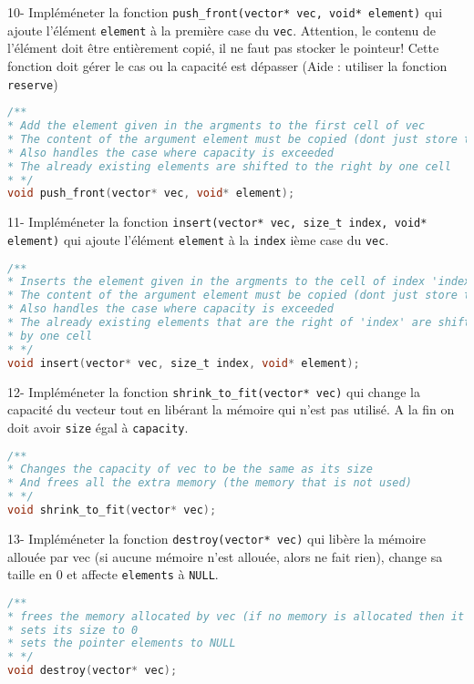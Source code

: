 \documentclass[a4paper]{article}
\begin{document}
	10- Impléméneter la fonction \texttt{push\_front(vector* vec, void* element)} qui ajoute l'élément \texttt{element} à la première case du \texttt{vec}. Attention, le contenu de l'élément doit être entièrement copié, il ne faut pas stocker le pointeur! Cette fonction doit gérer le cas ou la capacité est dépasser (Aide : utiliser la fonction \texttt{reserve})
\begin{lstlisting}[language=C]
/**
* Add the element given in the argments to the first cell of vec
* The content of the argument element must be copied (dont just store the pointer)
* Also handles the case where capacity is exceeded
* The already existing elements are shifted to the right by one cell
* */
void push_front(vector* vec, void* element);
\end{lstlisting}

	11- Impléméneter la fonction \texttt{insert(vector* vec, size\_t index, void* element)} qui ajoute l'élément \texttt{element} à la \texttt{index} ième case du \texttt{vec}.
	\begin{lstlisting}[language=C]
/**
* Inserts the element given in the argments to the cell of index 'index'
* The content of the argument element must be copied (dont just store the pointer)
* Also handles the case where capacity is exceeded
* The already existing elements that are the right of 'index' are shifted to the right 
* by one cell
* */
void insert(vector* vec, size_t index, void* element);
	\end{lstlisting}

	12- Impléméneter la fonction \texttt{shrink\_to\_fit(vector* vec)} qui change la capacité du vecteur tout en libérant la mémoire qui n'est pas utilisé. A la fin on doit avoir \texttt{size} égal à \texttt{capacity}.
\begin{lstlisting}[language=C]
/**
* Changes the capacity of vec to be the same as its size
* And frees all the extra memory (the memory that is not used)
* */
void shrink_to_fit(vector* vec);
\end{lstlisting}

	13- Impléméneter la fonction \texttt{destroy(vector* vec)} qui libère la mémoire allouée par vec (si aucune mémoire n'est allouée, alors ne fait rien), change sa taille en 0 et affecte \texttt{elements} à \texttt{NULL}.
\begin{lstlisting}[language=C]
/**
* frees the memory allocated by vec (if no memory is allocated then it does nothing)
* sets its size to 0
* sets the pointer elements to NULL
* */
void destroy(vector* vec);
\end{lstlisting}
\end{document}
